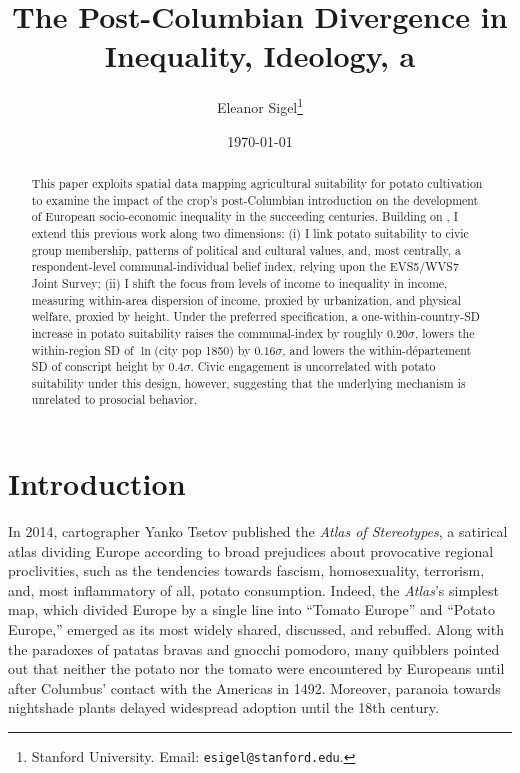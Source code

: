 \documentclass[11pt]{article}
\title{The Post-Columbian Divergence in Inequality, Ideology, a}
\author{Eleanor Sigel\thanks{Stanford University. Email: \texttt{esigel@stanford.edu}.}}
\date{\today}
\begin{document}
\maketitle

\begin{abstract}
\noindent
This paper exploits spatial data mapping agricultural suitability for potato cultivation to examine the impact of the crop's post-Columbian introduction on the development of European socio-economic inequality in the succeeding centuries. Building on \citet{NunnQian2011}, I extend this previous work along two dimensions: (i) I link potato suitability to civic group membership, patterns of political and cultural values, and, most centrally, a respondent-level communal-individual belief index, relying upon the EVS5/WVS7 Joint Survey; (ii) I shift the focus from levels of income to inequality in income, measuring within-area dispersion of income, proxied by urbanization, and physical welfare, proxied by height. Under the preferred specification, a one-within-country-SD increase in potato suitability raises the communal-index by roughly $0.20\sigma$, lowers the within-region SD of $\ln$(city pop 1850) by $0.16\sigma$, and lowers the within-département SD of conscript height by $0.4\sigma$. Civic engagement is uncorrelated with potato suitability under this design, however, suggesting that the underlying mechanism is unrelated to prosocial behavior.
\end{abstract}

\section{Introduction}

In 2014, cartographer Yanko Tsetov published the \emph{Atlas of Stereotypes}, a satirical atlas dividing Europe according to broad prejudices about provocative regional proclivities, such as the tendencies towards fascism, homosexuality, terrorism, and, most inflammatory of all, potato consumption. Indeed, the \emph{Atlas}'s simplest map, which divided Europe by a single line into ``Tomato Europe'' and ``Potato Europe,'' emerged as its most widely shared, discussed, and rebuffed. Along with the paradoxes of patatas bravas and gnocchi pomodoro, many quibblers pointed out that neither the potato nor the tomato were encountered by Europeans until after Columbus' contact with the Americas in 1492. Moreover, paranoia towards nightshade plants delayed widespread adoption until the 18th century.
\end{document}
